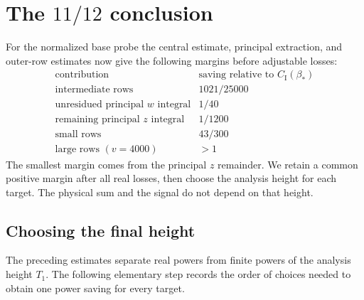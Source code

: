 \documentclass[11pt,a4paper]{article}
\numberwithin{equation}{section}
\numberwithin{figure}{section}
\theoremstyle{definition}
\theoremstyle{remark}
\begin{document}
\section{The \texorpdfstring{$11/12$}{11/12} conclusion}
\label{sec:eleven-twelfths-conclusion}

For the normalized base probe the central estimate, principal extraction,
and outer-row estimates now give the following margins before adjustable
losses:
\[
\begin{array}{c|c}
 \text{contribution}&\text{saving relative to }C_{\mathrm I}(\beta_*)\\\hline
 \text{intermediate rows}&1021/25000\\
 \text{unresidued principal }w\text{ integral}&1/40\\
 \text{remaining principal }z\text{ integral}&1/1200\\
 \text{small rows}&43/300\\
 \text{large rows }(v=4000)&>1
\end{array}
\]
The smallest margin comes from the principal $z$ remainder.  We retain a
common positive margin after all real losses, then choose the analysis
height for each target.  The physical sum and the signal do not depend on
that height.

\subsection{Choosing the final height}

The preceding estimates separate real powers from finite powers of the
analysis height $T_1$.  The following elementary step records the order
of choices needed to obtain one power saving for every target.
\end{document}
